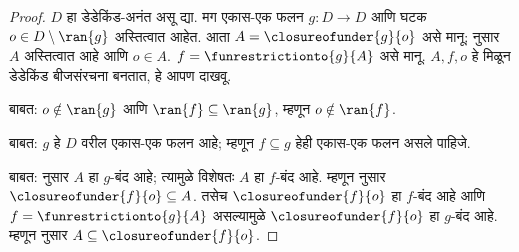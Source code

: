 \documentclass[../../../include/open-logic-section]{subfiles}
\begin{document}
\begin{proof}
$D$ हा डेडेकिंड-अनंत असू द्या. मग एकास-एक फलन $g \colon D \to D$
आणि घटक $o  \in D \setminus \ran{g}$ अस्तित्वात आहेत. आता $A =
\closureofunder{g}{o}$ असे मानू;  नुसार $A$
अस्तित्वात आहे आणि $o \in A$. $f = \funrestrictionto{g}{A}$ असे मानू.
$A, f, o$ हे मिळून डेडेकिंड बीजसंरचना बनतात, हे आपण दाखवू.

 बाबत: $o \notin \ran{g}$ आणि $\ran{f}
\subseteq \ran{g}$, म्हणून $o\notin \ran{f}$.

 बाबत: $g$ हे $D$ वरील एकास-एक फलन आहे; म्हणून
$f \subseteq g$ हेही एकास-एक फलन असले पाहिजे.

 बाबत:  नुसार $A$ हा
$g$-बंद आहे; त्यामुळे विशेषतः $A$ हा $f$-बंद आहे. म्हणून
 नुसार $\closureofunder{f}{o} \subseteq A$.
तसेच $\closureofunder{f}{o}$ हा $f$-बंद आहे आणि
$f = \funrestrictionto{g}{A}$ असल्यामुळे $\closureofunder{f}{o}$ हा
$g$-बंद आहे. म्हणून  नुसार
$A \subseteq \closureofunder{f}{o}$.
\end{proof}
\end{document}
